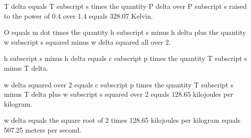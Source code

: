 T delta equals T subscript s times the quantity P delta over P subscript s raised to the power of 0.4 over 1.4 equals 328.07 Kelvin.

O equals m dot times the quantity h subscript s minus h delta plus the quantity w subscript s squared minus w delta squared all over 2.

h subscript s minus h delta equals c subscript p times the quantity T subscript s minus T delta.

w delta squared over 2 equals c subscript p times the quantity T subscript s minus T delta plus w subscript s squared over 2 equals 128.65 kilojoules per kilogram.

w delta equals the square root of 2 times 128.65 kilojoules per kilogram equals 507.25 meters per second.